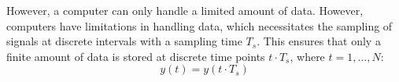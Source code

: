 However, a computer can only handle a limited amount of data. 
However, computers have limitations in handling data, which necessitates the sampling of signals at discrete intervals with a sampling time $T_s$. 
This ensures that only a finite amount of data is stored at discrete time points $t \cdot T_s$, where $t=1,\dots,N$: 
\[y(t)=y(t \cdot T_s)\]